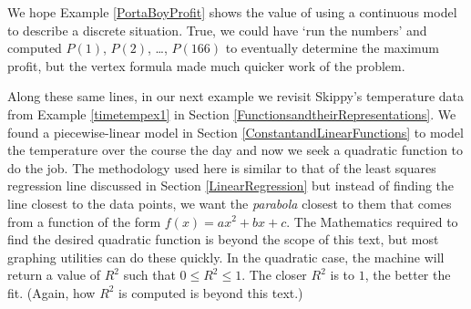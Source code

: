 We hope Example \ref{PortaBoyProfit}  shows the value of using a continuous model to describe a discrete situation.  True, we could have `run the numbers' and computed $P(1)$, $P(2)$, \ldots,  $P(166)$ to eventually determine the maximum profit, but the vertex formula made much quicker work of the problem.  

\medskip

Along these same lines, in our next example we revisit Skippy's temperature data from Example \ref{timetempex1} in Section \ref{FunctionsandtheirRepresentations}.  We found a piecewise-linear model in Section \ref{ConstantandLinearFunctions} to model the temperature over the course the day and now we seek a quadratic function to do the job.  The methodology used here is similar to that of the least squares regression line discussed in Section \ref{LinearRegression} but instead of finding the line closest to the data points, we want the \emph{parabola} closest to them that comes from a function of the form $f(x) = ax^{2} + bx + c$.  The Mathematics required to find the desired quadratic function is beyond the scope of this text, but most graphing utilities can do these quickly.  In the quadratic case, the machine will return a value of $R^{2}$ such that $0 \leq R^{2} \leq 1$.  The closer $R^{2}$ is to $1$, the better the fit.  (Again, how $R^{2}$ is computed is beyond this text.)

